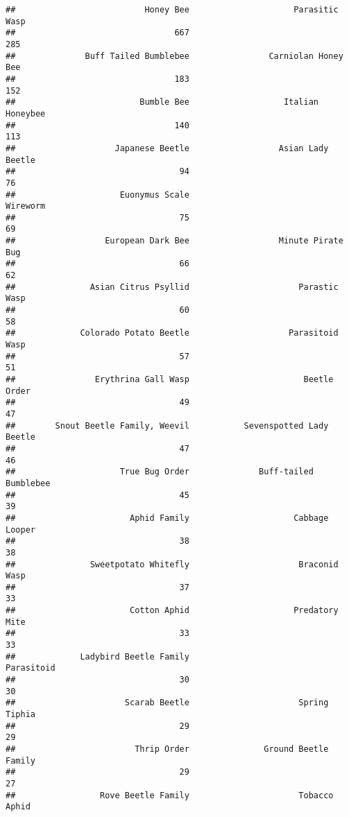 \documentclass[]{article}
\begin{document}
\begin{verbatim}
##                          Honey Bee                     Parasitic Wasp 
##                                667                                285 
##              Buff Tailed Bumblebee                Carniolan Honey Bee 
##                                183                                152 
##                         Bumble Bee                   Italian Honeybee 
##                                140                                113 
##                    Japanese Beetle                  Asian Lady Beetle 
##                                 94                                 76 
##                     Euonymus Scale                           Wireworm 
##                                 75                                 69 
##                  European Dark Bee                  Minute Pirate Bug 
##                                 66                                 62 
##               Asian Citrus Psyllid                      Parastic Wasp 
##                                 60                                 58 
##             Colorado Potato Beetle                    Parasitoid Wasp 
##                                 57                                 51 
##                Erythrina Gall Wasp                       Beetle Order 
##                                 49                                 47 
##        Snout Beetle Family, Weevil           Sevenspotted Lady Beetle 
##                                 47                                 46 
##                     True Bug Order              Buff-tailed Bumblebee 
##                                 45                                 39 
##                       Aphid Family                     Cabbage Looper 
##                                 38                                 38 
##               Sweetpotato Whitefly                      Braconid Wasp 
##                                 37                                 33 
##                       Cotton Aphid                     Predatory Mite 
##                                 33                                 33 
##             Ladybird Beetle Family                         Parasitoid 
##                                 30                                 30 
##                      Scarab Beetle                      Spring Tiphia 
##                                 29                                 29 
##                        Thrip Order               Ground Beetle Family 
##                                 29                                 27 
##                 Rove Beetle Family                      Tobacco Aphid 

\end{verbatim}
\end{document}
